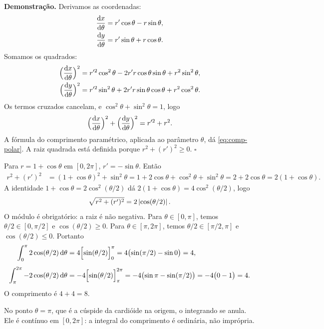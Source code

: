 \documentclass[11pt,a4paper]{article}
\begin{document}
\noindent\textbf{Demonstração.}
Derivamos as coordenadas:
\begin{align*}
\frac{\mathrm{d} x}{\mathrm{d}\theta}&=r'\cos\theta-r\sin\theta,\\
\frac{\mathrm{d} y}{\mathrm{d}\theta}&=r'\sin\theta+r\cos\theta.
\end{align*}
Somamos os quadrados:
\begin{align*}
\Bigl(\frac{\mathrm{d} x}{\mathrm{d}\theta}\Bigr)^{2}
&=r'^{2}\cos^{2}\theta-2r'r\cos\theta\sin\theta+r^{2}\sin^{2}\theta,\\
\Bigl(\frac{\mathrm{d} y}{\mathrm{d}\theta}\Bigr)^{2}
&=r'^{2}\sin^{2}\theta+2r'r\sin\theta\cos\theta+r^{2}\cos^{2}\theta.
\end{align*}
Os termos cruzados cancelam, e \(\cos^{2}\theta+\sin^{2}\theta=1\), logo
\[
\Bigl(\frac{\mathrm{d} x}{\mathrm{d}\theta}\Bigr)^{2}+\Bigl(\frac{\mathrm{d} y}{\mathrm{d}\theta}\Bigr)^{2}
=r'^{2}+r^{2}.
\]
A fórmula do comprimento paramétrico, aplicada ao parâmetro \(\theta\), dá \eqref{eq:comp-polar}. A raiz quadrada está definida porque \(r^{2}+(r')^{2}\ge 0\).
\hfill\(\square\)

\begin{exemplo}
Para \(r=1+\cos\theta\) em \([0,2\pi]\), \(r'=-\sin\theta\). Então
\begin{align*}
r^{2}+(r')^{2}
&=(1+\cos\theta)^{2}+\sin^{2}\theta
=1+2\cos\theta+\cos^{2}\theta+\sin^{2}\theta
=2+2\cos\theta
=2(1+\cos\theta).
\end{align*}
A identidade \(1+\cos\theta=2\cos^{2}(\theta/2)\) dá \(2(1+\cos\theta)=4\cos^{2}(\theta/2)\), logo
\[
\sqrt{r^{2}+(r')^{2}}=2\left\lvert \cos(\theta/2) \right\rvert.
\]
O módulo é obrigatório: a raiz é não negativa. Para \(\theta\in[0,\pi]\), temos \(\theta/2\in[0,\pi/2]\) e \(\cos(\theta/2)\ge 0\). Para \(\theta\in[\pi,2\pi]\), temos \(\theta/2\in[\pi/2,\pi]\) e \(\cos(\theta/2)\le 0\). Portanto
\begin{align*}
\int_{0}^{\pi} 2\cos(\theta/2)\,\mathrm{d}\theta
&=4\Bigl[\sin(\theta/2)\Bigr]_{0}^{\pi}
=4\bigl(\sin(\pi/2)-\sin 0\bigr)=4,\\[0.4em]
\int_{\pi}^{2\pi} -2\cos(\theta/2)\,\mathrm{d}\theta
&=-4\Bigl[\sin(\theta/2)\Bigr]_{\pi}^{2\pi}
=-4\bigl(\sin\pi-\sin(\pi/2)\bigr)
=-4\bigl(0-1\bigr)=4.
\end{align*}
O comprimento é \(4+4=8\).

No ponto \(\theta=\pi\), que é a cúspide da cardióide na origem, o integrando se anula. Ele é contínuo em \([0,2\pi]\): a integral do comprimento é ordinária, não imprópria.
\end{exemplo}
\end{document}
